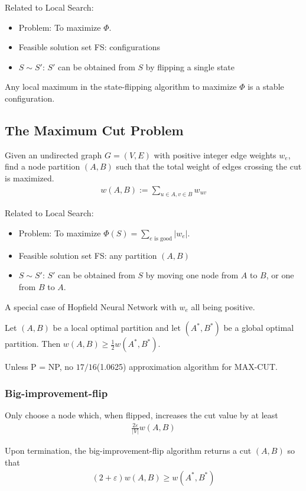 Related to Local Search:
\begin{itemize}
    \item Problem:  To maximize $\Phi$.
    \item Feasible solution set FS: configurations
    \item $S\sim S'$: $S'$ can be obtained from $S$ by flipping a single state
\end{itemize}
\begin{claim}
    Any local maximum in the state-flipping algorithm to maximize $\Phi$ is a stable configuration.
\end{claim}

\subsection{The Maximum Cut Problem}
Given an undirected graph $G = (V, E)$ with positive integer edge weights $w_e$, find a node partition $(A, B)$ such that the total weight of edges crossing the cut is maximized.
\begin{align*}
    w(A,B):=\sum_{u\in A, v\in B}w_{uv}
\end{align*}

Related to Local Search:
\begin{itemize}
    \item Problem:  To maximize $\displaystyle \Phi(S)=\sum_{e\text{ is good}}|w_e|$.
    \item Feasible solution set FS: any partition $(A, B)$ 
    \item $S\sim S'$: $S'$ can be obtained from $S$ by moving one node from $A$ to $B$, or one from $B$ to $A$.
\end{itemize}
A special case of Hopfield Neural Network with $w_e$ all being positive. 

\begin{claim}
    Let $(A, B)$ be a local optimal partition and let $(A^*, B^*)$ be a global optimal partition.  Then $w(A, B) \ge \frac{1}{2} w(A^*, B^*)$.
\end{claim}
Unless P = NP, no $17/16$(1.0625) approximation algorithm for MAX-CUT.

\subsubsection{Big-improvement-flip}
Only choose a node which, when flipped, increases the cut value by at least
\begin{align*}
    \frac{2\varepsilon}{|V|}w(A,B)
\end{align*}
\begin{claim}
    Upon termination, the big-improvement-flip algorithm returns a cut $(A, B)$ so that
    \begin{align*}
        (2+\varepsilon)w(A, B)\ge w(A^*, B^*)
    \end{align*}
\end{claim}

